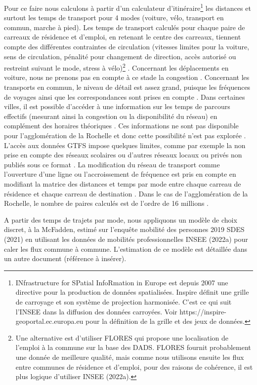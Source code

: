 \documentclass[
  10pt,
  a4paper,
  numbers=noendperiod,
  DIV=12]{scrartcl}
\begin{document}
Pour ce faire nous calculons à partir d'un calculateur
d'itinéraire\footnote{INfrastructure for SPatial InfoRmation in Europe
  est depuis 2007 une directive pour la production de données
  spatialisées. Inspire définit une grille de carroyage et son système
  de projection harmonisée. C'est ce qui suit l'INSEE dans la diffusion
  des données carroyées. Voir https://inspire-geoportal.ec.europa.eu
  pour la définition de la grille et des jeux de données.} les distances
et surtout les temps de transport pour 4 modes (voiture, vélo, transport
en commun, marche à pied). Les temps de transport calculés pour chaque
paire de carreaux de résidence et d'emploi, en retenant le centre des
carreaux, tiennent compte des différentes contraintes de circulation
(vitesses limites pour la voiture, sens de circulation, pénalité pour
changement de direction, accès autorisé ou restreint suivant le mode,
stress à vélo)\footnote{Une alternative est d'utiliser FLORES qui
  propose une localisation de l'emploi à la commune sur la base des
  DADS. FLORES fournit probablement une donnée de meilleure qualité,
  mais comme nous utilisons ensuite les flux entre communes de résidence
  et d'emploi, pour des raisons de cohérence, il est plus logique
  d'utiliser INSEE (2022a).} . Concernant les déplacements en voiture,
nous ne prenons pas en compte à ce stade la congestion . Concernant les
transports en commun, le niveau de détail est assez grand, puisque les
fréquences de voyages ainsi que les correspondances sont prises en
compte . Dans certaines villes, il est possible d'accéder à une
information sur les temps de parcours effectifs (mesurant ainsi la
congestion ou la disponibilité du réseau) en complément des horaires
théoriques . Ces informations ne sont pas disponible pour
l'agglomération de la Rochelle et donc cette possibilité n'est pas
explorée . L'accès aux données GTFS impose quelques limites, comme par
exemple la non prise en compte des réseaux scolaires ou d'autres réseaux
locaux ou privés non publiés sous ce format . La modification du réseau
de transport comme l'ouverture d'une ligne ou l'accroissement de
fréquence est pris en compte en modifiant la matrice des distances et
temps par mode entre chaque carreau de résidence et chaque carreau de
destination . Dans le cas de l'agglomération de la Rochelle, le nombre
de paires calculés est de l'ordre de 16 millions .

A partir des temps de trajets par mode, nous appliquons un modèle de
choix discret, à la McFadden, estimé sur l'enquête mobilité des
personnes 2019 SDES (2021) en utilisant les données de mobilités
professionnelles INSEE (2022a) pour caler les flux commune à commune.
L'estimation de ce modèle est détaillée dans un autre document
(référence à insérer).
\end{document}
